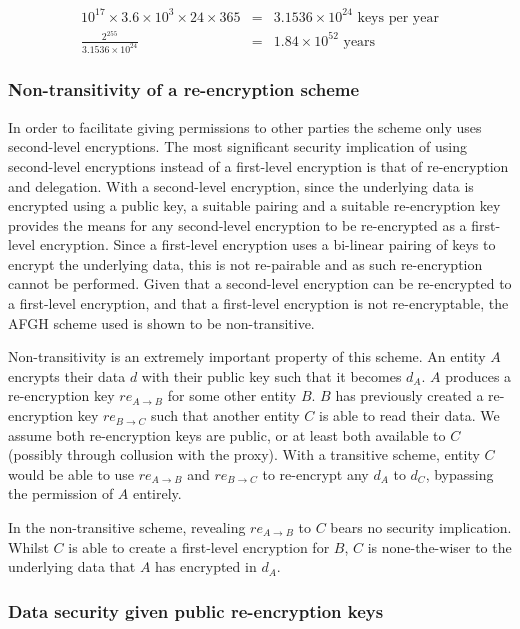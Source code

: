 $$
\begin{aligned}
  10^{17} \times 3.6 \times 10^{3} \times 24 \times 365 &=& 3.1536 \times 10^{24} \text{ keys per year} \\
  \frac{2^{255}}{3.1536 \times 10^{24}} &=& 1.84 \times 10^{52} \text{ years}
\end{aligned}
$$

\subsubsection{Non-transitivity of a re-encryption scheme}

In order to facilitate giving permissions to other parties the scheme only uses second-level encryptions. The most significant security implication of using second-level encryptions instead of a first-level encryption is that of re-encryption and delegation. With a second-level encryption, since the underlying data is encrypted using a public key, a suitable pairing and a suitable re-encryption key provides the means for any second-level encryption to be re-encrypted as a first-level encryption. Since a first-level encryption uses a bi-linear pairing of keys to encrypt the underlying data, this is not re-pairable and as such re-encryption cannot be performed. Given that a second-level encryption can be re-encrypted to a first-level encryption, and that a first-level encryption is not re-encryptable, the AFGH scheme used is shown to be non-transitive.

Non-transitivity is an extremely important property of this scheme. An entity $A$ encrypts their data $d$ with their public key such that it becomes $d_A$. $A$ produces a re-encryption key $re_{A \rightarrow B}$ for some other entity $B$. $B$ has previously created a re-encryption key $re_{B \rightarrow C}$ such that another entity $C$ is able to read their data. We assume both re-encryption keys are public, or at least both available to $C$ (possibly through collusion with the proxy). With a transitive scheme, entity $C$ would be able to use $re_{A \rightarrow B}$ and $re_{B \rightarrow C}$ to re-encrypt any $d_A$ to $d_C$, bypassing the permission of $A$ entirely.

In the non-transitive scheme, revealing $re_{A \rightarrow B}$ to $C$ bears no security implication. Whilst $C$ is able to create a first-level encryption for $B$, $C$ is none-the-wiser to the underlying data that $A$ has encrypted in $d_A$.

\subsubsection{Data security given public re-encryption keys}

